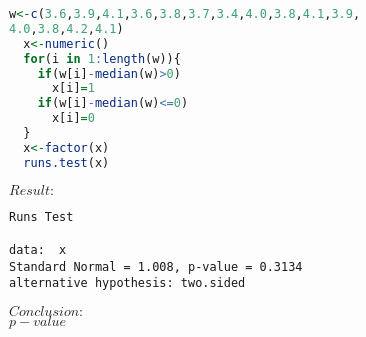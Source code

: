 \documentclass[UTF8,a4paper]{ctexart}
\begin{document}
\begin{enumerate}
\begin{lstlisting}[language=R]
w<-c(3.6,3.9,4.1,3.6,3.8,3.7,3.4,4.0,3.8,4.1,3.9,
4.0,3.8,4.2,4.1)
  x<-numeric()
  for(i in 1:length(w)){
    if(w[i]-median(w)>0)
      x[i]=1
    if(w[i]-median(w)<=0)
      x[i]=0
  }
  x<-factor(x)
  runs.test(x)
\end{lstlisting}
{\color{red} \large \textbf{$ Result:$}}\\

\begin{verbatim}
Runs Test

data:  x
Standard Normal = 1.008, p-value = 0.3134
alternative hypothesis: two.sided
\end{verbatim}

\textcolor[rgb]{0.28,0.9,0.8} {\large \textbf{$ Conclusion:$}}\\
$p-value$











\end{enumerate}
\end{document}
